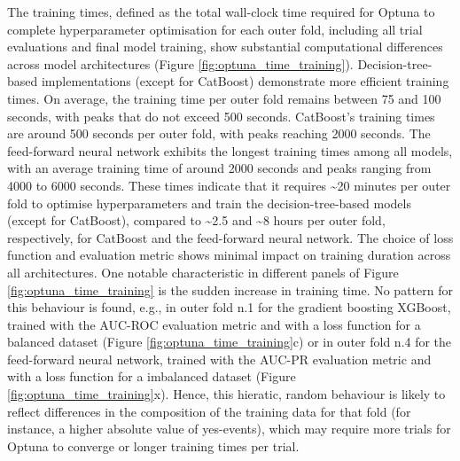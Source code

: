 The  training times, defined as the total wall-clock time required for Optuna to complete hyperparameter optimisation for each outer fold, including all trial evaluations and final model training, show substantial computational differences across model architectures (Figure \ref{fig:optuna_time_training}). Decision-tree-based implementations (except for CatBoost) demonstrate more efficient training times. On average, the training time per outer fold remains between 75 and 100 seconds, with peaks that do not exceed 500 seconds. CatBoost's training times are around 500 seconds per outer fold, with peaks reaching 2000 seconds. The feed-forward neural network exhibits the longest training times among all models, with an average training time of around 2000 seconds and peaks ranging from 4000 to 6000 seconds. These times indicate that it requires \sim20 minutes per outer fold to optimise hyperparameters and train the decision-tree-based models (except for CatBoost), compared to \sim2.5 and \sim8 hours per outer fold, respectively, for CatBoost and the feed-forward neural network. The choice of loss function and evaluation metric shows minimal impact on training duration across all architectures. One notable characteristic in different panels of Figure \ref{fig:optuna_time_training} is the sudden increase in training time. No pattern for this behaviour is found, e.g., in outer fold n.1 for the gradient boosting XGBoost, trained with the AUC-ROC evaluation metric and with a loss function for a balanced dataset (Figure \ref{fig:optuna_time_training}c) or in outer fold n.4 for the feed-forward neural network, trained with the AUC-PR evaluation metric and with a loss function for a imbalanced dataset (Figure \ref{fig:optuna_time_training}x). Hence, this hieratic, random behaviour is likely to reflect differences in the composition of the training data for that fold (for instance, a higher absolute value of yes-events), which may require more trials for Optuna to converge or longer training times per trial.

